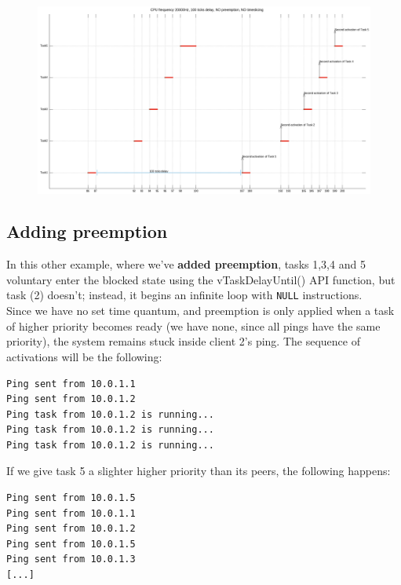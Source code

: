 \documentclass[10pt]{article}
\begin{document}
\begin{figure}[H]
    \centering
    \includegraphics[width=1.0\linewidth]{Pictures/firstGantt.png}
    \caption{}
    \label{fig:4}
\end{figure}

\subsection{Adding preemption}
In this other example, where we've \textbf{added preemption}, tasks 1,3,4 and 5 voluntary enter the blocked state using the vTaskDelayUntil() API function, but task (2) doesn't; instead, it begins an infinite loop with \verb|NULL| instructions. \\ Since we have no set time quantum, and preemption is only applied when a task of higher priority becomes ready (we have none, since all pings have the same priority), the system remains stuck inside client 2's ping.
The sequence of activations will be the following:
\begin{lstlisting}
Ping sent from 10.0.1.1
Ping sent from 10.0.1.2
Ping task from 10.0.1.2 is running...
Ping task from 10.0.1.2 is running...
Ping task from 10.0.1.2 is running...
\end{lstlisting}

If we give task 5 a slighter higher priority than its peers, the following happens:
\begin{lstlisting}
Ping sent from 10.0.1.5
Ping sent from 10.0.1.1
Ping sent from 10.0.1.2
Ping sent from 10.0.1.5
Ping sent from 10.0.1.3
[...]
\end{lstlisting}
\end{document}
